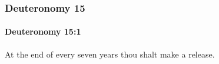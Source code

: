 	\subsubsection{Deuteronomy 15} %
		\label{DEUTERONOMY-15}

		\paragraph{Deuteronomy 15:1} %
			\label{DEUTERONOMY-15-1}

			At the end of every seven years thou shalt make a release.


